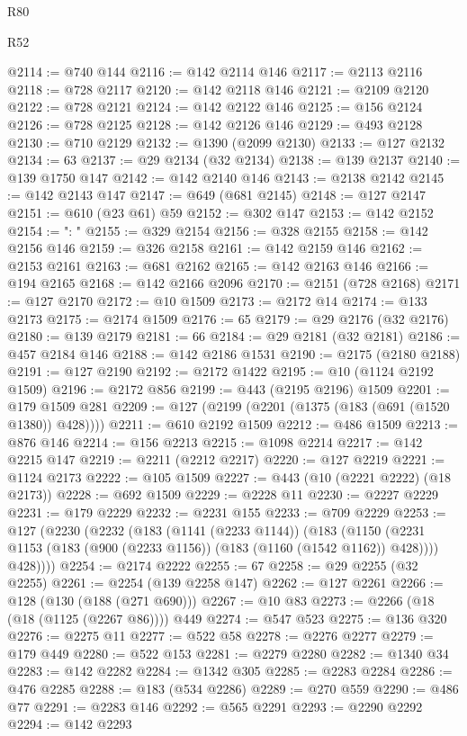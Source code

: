 \begin{lexlean}{R80}
\begin{lexlean}{R52}
\begin{coremodule}
{{{{{{{{{{{{{{{{{{{{{{{{{{{{{{{{{{{{{{{{{{{{{{{{{{{{{{{{{{{{{{{{{{{{{{{{{{{{{{{{{{{{{{{{{{{{{{{{{{{{{{{{{{{{{{{{{{{{{{{{{{{{{{{{{{{{{{{{{{{{{{{{{{{{{{{{{{{{{{{{{{{{{{{{{{{{{{{{{{{{{{{{{{{{{{{{{{{{{{@2114 := @740 @144
@2116 := @142 @2114 @146
@2117 := @2113 @2116
@2118 := @728 @2117
@2120 := @142 @2118 @146
@2121 := @2109 @2120
@2122 := @728 @2121
@2124 := @142 @2122 @146
@2125 := @156 @2124
@2126 := @728 @2125
@2128 := @142 @2126 @146
@2129 := @493 @2128
@2130 := @710 @2129
@2132 := @1390 (@2099 @2130)
@2133 := @127 @2132
@2134 := 63
@2137 := @29 @2134 (@32 @2134)
@2138 := @139 @2137
@2140 := @139 @1750 @147
@2142 := @142 @2140 @146
@2143 := @2138 @2142
@2145 := @142 @2143 @147
@2147 := @649 (@681 @2145)
@2148 := @127 @2147
@2151 := @610 (@23 @61) @59
@2152 := @302 @147
@2153 := @142 @2152
@2154 := ": "
@2155 := @329 @2154
@2156 := @328 @2155
@2158 := @142 @2156 @146
@2159 := @326 @2158
@2161 := @142 @2159 @146
@2162 := @2153 @2161
@2163 := @681 @2162
@2165 := @142 @2163 @146
@2166 := @194 @2165
@2168 := @142 @2166 @2096
@2170 := @2151 (@728 @2168)
@2171 := @127 @2170
@2172 := @10 @1509
@2173 := @2172 @14
@2174 := @133 @2173
@2175 := @2174 @1509
@2176 := 65
@2179 := @29 @2176 (@32 @2176)
@2180 := @139 @2179
@2181 := 66
@2184 := @29 @2181 (@32 @2181)
@2186 := @457 @2184 @146
@2188 := @142 @2186 @1531
@2190 := @2175 (@2180 @2188)
@2191 := @127 @2190
@2192 := @2172 @1422
@2195 := @10 (@1124 @2192 @1509)
@2196 := @2172 @856
@2199 := @443 (@2195 @2196) @1509
@2201 := @179 @1509 @281
@2209 := @127 (@2199 (@2201 (@1375 (@183 (@691 (@1520 @1380)) @428))))
@2211 := @610 @2192 @1509
@2212 := @486 @1509
@2213 := @876 @146
@2214 := @156 @2213
@2215 := @1098 @2214
@2217 := @142 @2215 @147
@2219 := @2211 (@2212 @2217)
@2220 := @127 @2219
@2221 := @1124 @2173
@2222 := @105 @1509
@2227 := @443 (@10 (@2221 @2222) (@18 @2173))
@2228 := @692 @1509
@2229 := @2228 @11
@2230 := @2227 @2229
@2231 := @179 @2229
@2232 := @2231 @155
@2233 := @709 @2229
@2253 := @127
    (@2230
      (@2232
        (@183
          (@1141 (@2233 @1144))
          (@183
            (@1150 (@2231 @1153 (@183 (@900 (@2233 @1156)) (@183 (@1160 (@1542 @1162)) @428))))
            @428))))
@2254 := @2174 @2222
@2255 := 67
@2258 := @29 @2255 (@32 @2255)
@2261 := @2254 (@139 @2258 @147)
@2262 := @127 @2261
@2266 := @128 (@130 (@188 (@271 @690)))
@2267 := @10 @83
@2273 := @2266 (@18 (@18 (@1125 (@2267 @86)))) @449
@2274 := @547 @523
@2275 := @136 @320
@2276 := @2275 @11
@2277 := @522 @58
@2278 := @2276 @2277
@2279 := @179 @449
@2280 := @522 @153
@2281 := @2279 @2280
@2282 := @1340 @34
@2283 := @142 @2282
@2284 := @1342 @305
@2285 := @2283 @2284
@2286 := @476 @2285
@2288 := @183 (@534 @2286)
@2289 := @270 @559
@2290 := @486 @77
@2291 := @2283 @146
@2292 := @565 @2291
@2293 := @2290 @2292
@2294 := @142 @2293
}}}}}}}}}}}}}}}}}}}}}}}}}}}}}}}}}}}}}}}}}}}}}}}}}}}}}}}}}}}}}}}}}}}}}}}}}}}}}}}}}}}}}}}}}}}}}}}}}}}}}}}}}}}}}}}}}}}}}}}}}}}}}}}}}}}}}}}}}}}}}}}}}}}}}}}}}}}}}}}}}}}}}}}}}}}}}}}}}}}}}}}}}}}}}}}}}}}}}}
\end{coremodule}
\end{lexlean}
\end{lexlean}
